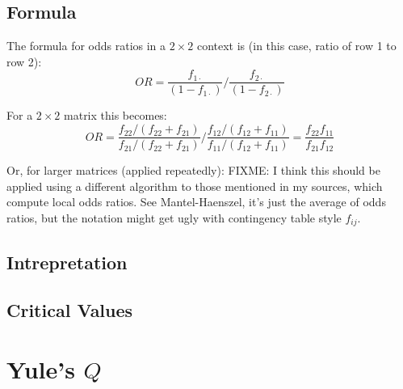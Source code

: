 \documentclass[11pt]{article}
\begin{document}
\subsection{Formula}
The formula for odds ratios in a $2\times 2$ context is (in this case, ratio of row 1 to row 2):
$$
OR = {   \frac{ f_{1\cdot} }{ (1-f_{1\cdot}) }   \bigg /  \frac{ f_{2\cdot} }{ (1-f_{2\cdot}) }        }
$$

For a $2\times 2$ matrix this becomes:
$$
OR = { \dfrac{f_{22}/(f_{22}+f_{21})}{f_{21}/(f_{22}+f_{21})} \bigg / \dfrac{f_{12}/(f_{12}+f_{11})}{f_{11}/(f_{12}+f_{11})}} = \dfrac{f_{22}f_{11}}{f_{21}f_{12}}
$$


Or, for larger matrices (applied repeatedly):
FIXME: I think this should be applied using a different algorithm to those mentioned in my sources, which compute local odds ratios.  
See Mantel-Haenszel, it's just the average of odds ratios, but the notation might get ugly with contingency table style $f_{ij}$.

\subsection{Intrepretation}

\subsection{Critical Values}













\section{Yule's $Q$}
\label{section:yulesq}
\end{document}
